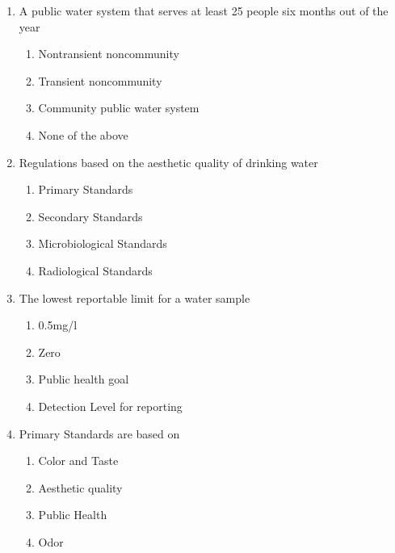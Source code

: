 \documentclass[10pt]{article}
\begin{document}
\begin{enumerate}
\item  A public water system that serves at least 25 people six months out of the year\\
\begin{enumerate}
\item Nontransient noncommunity\\
\item Transient noncommunity\\
\item Community public water system\\
\item None of the above
\end{enumerate}

\item  Regulations based on the aesthetic quality of drinking water\\
\begin{enumerate}
\item Primary Standards\\
\item Secondary Standards\\
\item Microbiological Standards\\
\item Radiological Standards
\end{enumerate}

\item  The lowest reportable limit for a water sample\\
\begin{enumerate}
\item 0.5mg/l\\
\item Zero\\
\item Public health goal\\
\item Detection Level for reporting
\end{enumerate}

\item  Primary Standards are based on\\
\begin{enumerate}
\item Color and Taste\\
\item Aesthetic quality\\
\item Public Health\\
\item Odor
\end{enumerate}


\end{enumerate}
\end{document}
